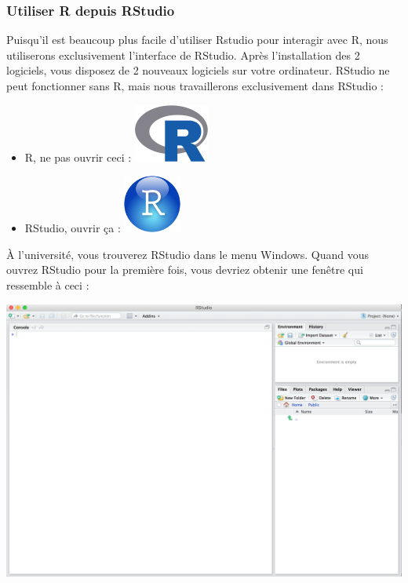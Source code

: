 \documentclass[
  a4paper,
]{article}
\providecommand{\tightlist}{%
  \setlength{\itemsep}{0pt}\setlength{\parskip}{0pt}}
\begin{document}
\hypertarget{utiliser-r-depuis-rstudio}{%
\subsubsection{Utiliser R depuis RStudio}\label{utiliser-r-depuis-rstudio}}

Puisqu'il est beaucoup plus facile d'utiliser Rstudio pour interagir avec R, nous utiliserons exclusivement l'interface de RStudio. Après l'installation des 2 logiciels, vous disposez de 2 nouveaux logiciels sur votre ordinateur. RStudio ne peut fonctionner sans R, mais nous travaillerons exclusivement dans RStudio :

\begin{itemize}
\tightlist
\item
  R, ne pas ouvrir ceci : \includegraphics{images/Rlogo.png}
\item
  RStudio, ouvrir ça : \includegraphics{images/RStudio-Ball.png}
\end{itemize}

À l'université, vous trouverez RStudio dans le menu Windows. Quand vous ouvrez RStudio pour la première fois, vous devriez obtenir une fenêtre qui ressemble à ceci :

\includegraphics{images/rstudio.png}
\end{document}
